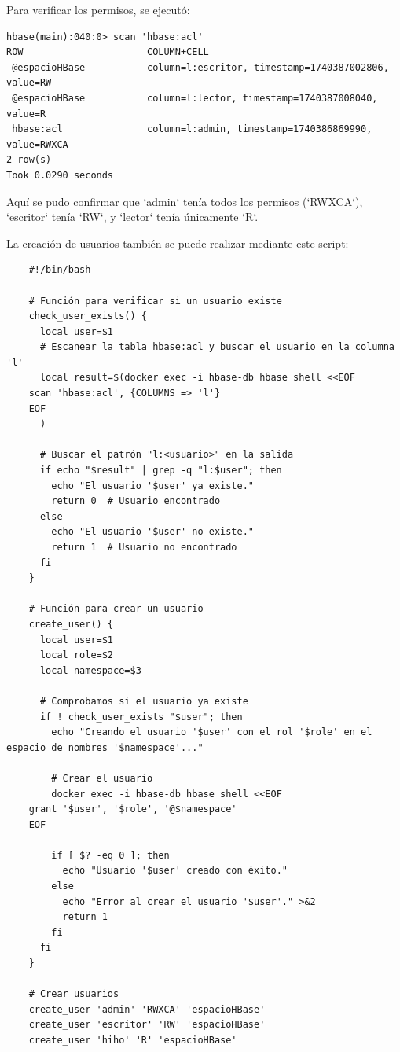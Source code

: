 \documentclass{article}
\begin{document}
Para verificar los permisos, se ejecutó:

\begin{lstlisting}[style=bashStyle]
hbase(main):040:0> scan 'hbase:acl'
ROW                      COLUMN+CELL
 @espacioHBase           column=l:escritor, timestamp=1740387002806, value=RW
 @espacioHBase           column=l:lector, timestamp=1740387008040, value=R
 hbase:acl               column=l:admin, timestamp=1740386869990, value=RWXCA
2 row(s)
Took 0.0290 seconds
\end{lstlisting}

Aquí se pudo confirmar que `admin` tenía todos los permisos (`RWXCA`), `escritor` tenía `RW`, y `lector` tenía únicamente `R`.

La creación de usuarios también se puede realizar mediante este script:
\begin{verbatim}
    #!/bin/bash

    # Función para verificar si un usuario existe
    check_user_exists() {
      local user=$1
      # Escanear la tabla hbase:acl y buscar el usuario en la columna 'l'
      local result=$(docker exec -i hbase-db hbase shell <<EOF
    scan 'hbase:acl', {COLUMNS => 'l'}
    EOF
      )
    
      # Buscar el patrón "l:<usuario>" en la salida
      if echo "$result" | grep -q "l:$user"; then
        echo "El usuario '$user' ya existe."
        return 0  # Usuario encontrado
      else
        echo "El usuario '$user' no existe."
        return 1  # Usuario no encontrado
      fi
    }
    
    # Función para crear un usuario
    create_user() {
      local user=$1
      local role=$2
      local namespace=$3
    
      # Comprobamos si el usuario ya existe
      if ! check_user_exists "$user"; then
        echo "Creando el usuario '$user' con el rol '$role' en el espacio de nombres '$namespace'..."
    
        # Crear el usuario
        docker exec -i hbase-db hbase shell <<EOF
    grant '$user', '$role', '@$namespace'
    EOF
    
        if [ $? -eq 0 ]; then
          echo "Usuario '$user' creado con éxito."
        else
          echo "Error al crear el usuario '$user'." >&2
          return 1
        fi
      fi
    }
    
    # Crear usuarios
    create_user 'admin' 'RWXCA' 'espacioHBase'
    create_user 'escritor' 'RW' 'espacioHBase'
    create_user 'hiho' 'R' 'espacioHBase'
\end{verbatim}
\end{document}

